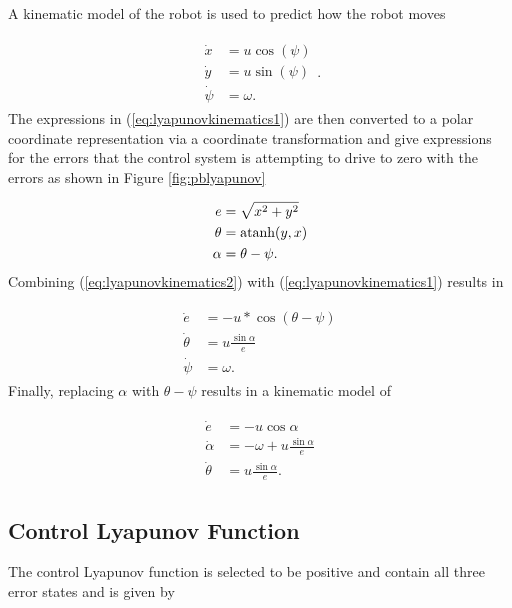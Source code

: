A kinematic model of the robot is used to predict how the robot moves

\begin{align}
\label{eq:lyapunovkinematics1}
\begin{split}
\dot{x} &= u\cos(\psi) \\
\dot{y} &= u\sin(\psi) \\
\dot{\psi} &= \omega.
\end{split}.
\end{align}
The expressions in (\ref{eq:lyapunovkinematics1}) are then converted to a polar coordinate representation via a coordinate transformation and give expressions for the errors that the control system is attempting to drive to zero with the errors as shown in Figure \ref{fig:pblyapunov}

\begin{align}
\label{eq:lyapunovkinematics2}
\begin{split}
e &= \sqrt{x^2+y^2} \\
\theta &= \mathop{\text{atanh}}(y,x) \\
\alpha &= \theta - \psi.
\end{split}
\end{align}
Combining (\ref{eq:lyapunovkinematics2}) with (\ref{eq:lyapunovkinematics1}) results in

\begin{align}
\label{eq:lyapunovkinematics3}
\begin{split}
\dot{e} &= -u*\cos(\theta-\psi) \\
\dot{\theta} &= u\frac{\sin\alpha}{e} \\
\dot{\psi} &= \omega.
\end{split}
\end{align}
Finally, replacing $\alpha$ with $\theta-\psi$ results in a kinematic model of

\begin{align}
\label{eq:lyapunovkinematics}
\begin{split}
\dot{e} &= -u\cos\alpha \\
\dot{\alpha} &= -\omega + u\frac{\sin\alpha}{e} \\
\dot{\theta} &= u\frac{\sin\alpha}{e}.
\end{split}
\end{align}

\subsection{Control Lyapunov Function}
\label{sec:controllyapunov}
The control Lyapunov function is selected to be positive and contain all three error states and is given by

